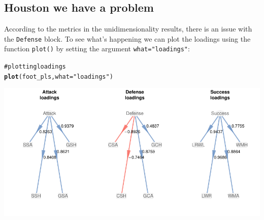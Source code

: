 \documentclass[12pt]{book}\usepackage{graphicx, color}
\makeatletter
\newcommand{\hlfunctioncall}[1]{\textcolor[rgb]{0.501960784313725,0,0.329411764705882}{\textbf{#1}}}%
\newcommand{\hlstring}[1]{\textcolor[rgb]{0.6,0.6,1}{#1}}%
\newcommand{\hlcomment}[1]{\textcolor[rgb]{0.180392156862745,0.6,0.341176470588235}{#1}}%
\newenvironment{kframe}{%
 \def\at@end@of@kframe{}%
 \ifinner\ifhmode%
  \def\at@end@of@kframe{\end{minipage}}%
  \begin{minipage}{\columnwidth}%
 \fi\fi%
 \def\FrameCommand##1{\hskip\@totalleftmargin \hskip-\fboxsep
 \colorbox{shadecolor}{##1}\hskip-\fboxsep
     \hskip-\linewidth \hskip-\@totalleftmargin \hskip\columnwidth}%
 \MakeFramed {\advance\hsize-\width
   \@totalleftmargin\z@ \linewidth\hsize
   \@setminipage}}%
 {\par\unskip\endMakeFramed%
 \at@end@of@kframe}
\newenvironment{knitrout}{}{} %
\newcommand{\code}[1]{\texttt{#1}}
\makeatother
\begin{document}
\subsection*{Houston we have a problem}
According to the metrics in the unidimensionality results, there is an issue with the \code{Defense} block. To see what's happening we can plot the loadings using the function \code{plot()} by setting the argument \code{what="loadings"}:
\begin{knitrout}
\color{fgcolor}\begin{kframe}
\begin{alltt}
\hlcomment{# plotting loadings}
\hlfunctioncall{plot}(foot_pls, what = \hlstring{"loadings"})
\end{alltt}
\end{kframe}

{\centering \includegraphics[width=1\linewidth,height=.5\linewidth]{figure/plot_loadings2} 

}



\end{knitrout}
\end{document}
